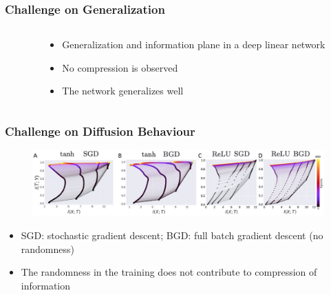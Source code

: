 \documentclass[notes]{beamer}
\begin{document}
\begin{frame}
    \frametitle{Challenge on Generalization}
    \begin{columns}
        \begin{column}{0.5\textwidth}
        \end{column}
        \begin{column}{0.5\textwidth}
            \begin{itemize}
                \item Generalization and information plane in a deep linear network
                \item No compression is observed
                \item The network generalizes well
            \end{itemize}
        \end{column}
    \end{columns}
\end{frame}

\begin{frame}
    \frametitle{Challenge on Diffusion Behaviour}
    \begin{figure}
        \centering
        \includegraphics[width=12cm]{BGD.jpg}
    \end{figure}
    \begin{itemize}
        \item SGD: stochastic gradient descent; BGD: full batch gradient descent (no randomness)
        \item The randomness in the training does not contribute to compression of information
    \end{itemize}
    

\end{frame}
\end{document}
